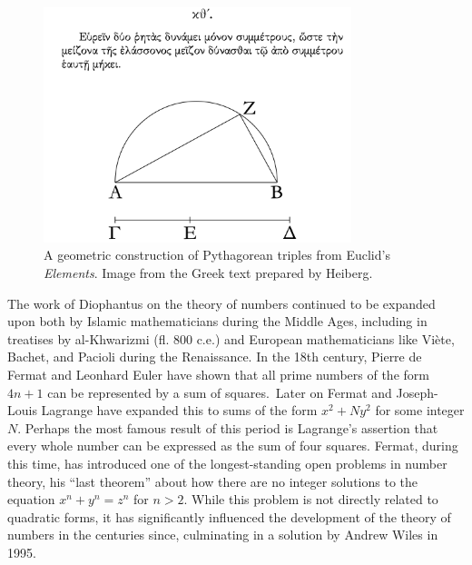 \begin{figure}
    \centering
    \includegraphics[width=0.8\textwidth]{assets/euclid.png}
    \caption[A geometric construction of Pythagorean triples.]{A geometric construction of Pythagorean triples from Euclid's \emph{Elements}. Image from the Greek text prepared by Heiberg. \cite{heiberg1885euclid}}
    \label{fig:pythagorean-triples}
\end{figure}


The work of Diophantus on the theory of numbers continued to be expanded upon both by Islamic mathematicians during the Middle Ages, including in treatises by al-Khwarizmi (fl. 800 {\sc c.e.}) and European mathematicians like Vi\`ete, Bachet, and Pacioli during the Renaissance. In the 18th century, Pierre de Fermat and Leonhard Euler have shown that all prime numbers of the form \(4n + 1\) can be represented by a sum of squares.\,\cite{hahn2008quadratic} Later on Fermat and Joseph-Louis Lagrange have expanded this to sums of the form \(x^2 + Ny^2\) for some integer \(N\). Perhaps the most famous result of this period is Lagrange's assertion that every whole number can be expressed as the sum of four squares. Fermat, during this time, has introduced one of the longest-standing open problems in number theory, his ``last theorem'' about how there are no integer solutions to the equation \(x^n + y^n = z^n\) for \(n > 2\). While this problem is not directly related to quadratic forms, it has significantly influenced the development of the theory of numbers in the centuries since, culminating in a solution by Andrew Wiles in 1995. \cite{wiles1995modular}

